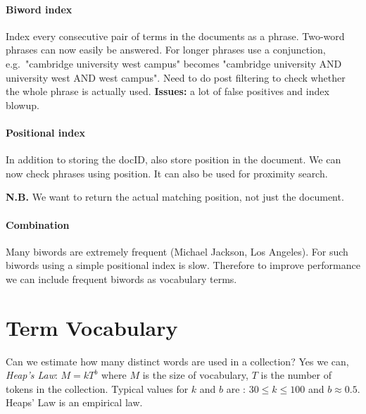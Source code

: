 \documentclass[a5paper]{report}
\newcommand\nb{\par\nobreak\smallskip\textbf{N.B. }}
\begin{document}
\paragraph{Biword index}
Index every consecutive pair of terms in the documents as a phrase.
Two-word phrases can now easily be answered.
For longer phrases use a conjunction, e.g.\ "cambridge university west campus" becomes "cambridge university AND university west AND west campus".
Need to do post filtering to check whether the whole phrase is actually used. \textbf{Issues:} a lot of false positives and index blowup.
\paragraph{Positional index}
In addition to storing the docID, also store position in the document.
We can now check phrases using position.
It can also be used for proximity search.
\nb We want to return the actual matching position, not just the document.
\paragraph{Combination}
Many biwords are extremely frequent (Michael Jackson, Los Angeles).
For such biwords using a simple positional index is slow.
Therefore to improve performance we can include frequent biwords as vocabulary terms.

\section{Term Vocabulary}
Can we estimate how many distinct words are used in a collection?
Yes we can, \emph{Heap's Law}: $M = kT^b$ where $M$ is the size of vocabulary, $T$ is the number of tokens in the collection.
Typical values for $k$ and $b$ are : $30\leq k\leq 100$ and $b \approx 0.5$.
Heaps' Law is an empirical law.
\end{document}
